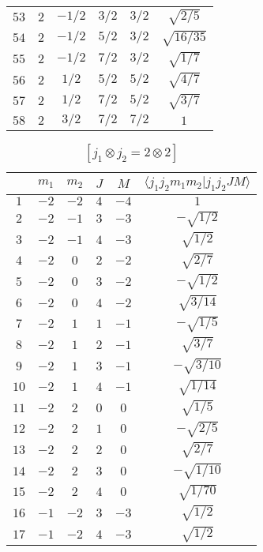 \begin{table}
\begin{center}
\begin{tabular}{|c|c|c|c|c|c|}
$53$ & $2$ & $-1/2$ & $3/2$ & $3/2$ & $\sqrt{2/5}$ \\ 
$54$ & $2$ & $-1/2$ & $5/2$ & $3/2$ & $\sqrt{16/35}$ \\ 
$55$ & $2$ & $-1/2$ & $7/2$ & $3/2$ & $\sqrt{1/7}$ \\ 
$56$ & $2$ & $1/2$ & $5/2$ & $5/2$ & $\sqrt{4/7}$ \\ 
$57$ & $2$ & $1/2$ & $7/2$ & $5/2$ & $\sqrt{3/7}$ \\ 
$58$ & $2$ & $3/2$ & $7/2$ & $7/2$ & $1$ \\ 
\hline 
\end{tabular}
\end{center}
\end{table}

\begin{table}
\tiny
\caption{$[j_1 \otimes j_2 = 2 \otimes 2]$}
\begin{center}
\begin{tabular}{|c|c|c|c|c|c|}
\hline 
   & $m_1$ & $m_2$ & $J$ & $M$ & $\langle j_1 j_2 m_1 m_2 | j_1 j_2 J M \rangle$ \\ 
\hline 
$1$ & $-2$ & $-2$ & $4$ & $-4$ & $1$ \\ 
$2$ & $-2$ & $-1$ & $3$ & $-3$ & $-\sqrt{1/2}$ \\ 
$3$ & $-2$ & $-1$ & $4$ & $-3$ & $\sqrt{1/2}$ \\ 
$4$ & $-2$ & $0$ & $2$ & $-2$ & $\sqrt{2/7}$ \\ 
$5$ & $-2$ & $0$ & $3$ & $-2$ & $-\sqrt{1/2}$ \\ 
$6$ & $-2$ & $0$ & $4$ & $-2$ & $\sqrt{3/14}$ \\ 
$7$ & $-2$ & $1$ & $1$ & $-1$ & $-\sqrt{1/5}$ \\ 
$8$ & $-2$ & $1$ & $2$ & $-1$ & $\sqrt{3/7}$ \\ 
$9$ & $-2$ & $1$ & $3$ & $-1$ & $-\sqrt{3/10}$ \\ 
$10$ & $-2$ & $1$ & $4$ & $-1$ & $\sqrt{1/14}$ \\ 
$11$ & $-2$ & $2$ & $0$ & $0$ & $\sqrt{1/5}$ \\ 
$12$ & $-2$ & $2$ & $1$ & $0$ & $-\sqrt{2/5}$ \\ 
$13$ & $-2$ & $2$ & $2$ & $0$ & $\sqrt{2/7}$ \\ 
$14$ & $-2$ & $2$ & $3$ & $0$ & $-\sqrt{1/10}$ \\ 
$15$ & $-2$ & $2$ & $4$ & $0$ & $\sqrt{1/70}$ \\ 
$16$ & $-1$ & $-2$ & $3$ & $-3$ & $\sqrt{1/2}$ \\ 
$17$ & $-1$ & $-2$ & $4$ & $-3$ & $\sqrt{1/2}$ \\ 

\end{tabular}
\end{center}
\end{table}
